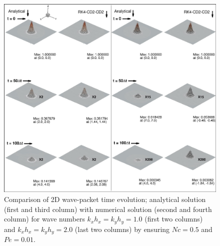 \documentclass[showpacs,preprintnumbers,amsmath,amssymb]{revtex4-1} %
\begin{document}
\begin{figure}[h]
\begin{center}
\includegraphics[width=150mm]{wave_pac_cd2_cd2.pdf}
\end{center}    
\raggedleft
\caption{Comparison of 2D wave-packet time evolution; analytical solution (first and third column) with numerical solution (second and fourth column) for wave numbers $k_xh_x=k_yh_y=1.0$ (first two columns) and $k_xh_x=k_yh_y=2.0$ (last two columns) by ensuring $Nc=0.5$ and $Pe=0.01$.}
\label{fig_wave1}
\end{figure}
\end{document}
